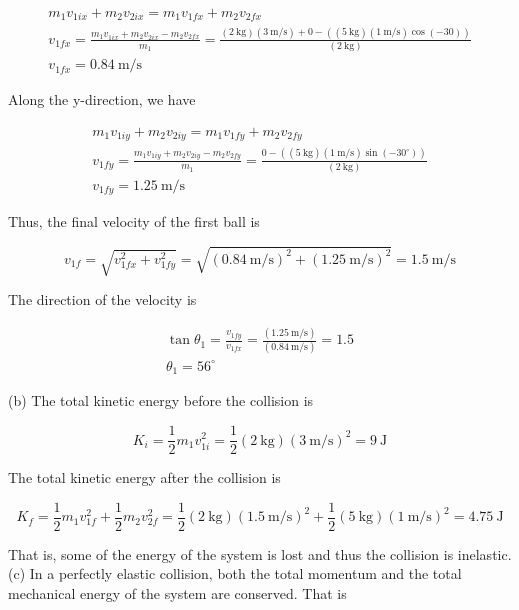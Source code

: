 \documentclass[10pt]{article}
\numberwithin{equation}{section}
\begin{document}
$$
\begin{gathered}
m_{1} v_{1 i x}+m_{2} v_{2 i x}=m_{1} v_{1 f x}+m_{2} v_{2 f x} \\
v_{1 f x}=\frac{m_{1} v_{1 i x}+m_{2} v_{2 i x}-m_{2} v_{2 f x}}{m_{1}}=\frac{(2 \mathrm{~kg})(3 \mathrm{~m} / \mathrm{s})+0-((5 \mathrm{~kg})(1 \mathrm{~m} / \mathrm{s}) \cos (-30))}{(2 \mathrm{~kg})} \\
v_{1 f x}=0.84 \mathrm{~m} / \mathrm{s}
\end{gathered}
$$

Along the y-direction, we have

$$
\begin{gathered}
m_{1} v_{1 i y}+m_{2} v_{2 i y}=m_{1} v_{1 f y}+m_{2} v_{2 f y} \\
v_{1 f y}=\frac{m_{1} v_{1 i y}+m_{2} v_{2 i y}-m_{2} v_{2 f y}}{m_{1}}=\frac{0-\left((5 \mathrm{~kg})(1 \mathrm{~m} / \mathrm{s}) \sin \left(-30^{\circ}\right)\right)}{(2 \mathrm{~kg})} \\
v_{1 f y}=1.25 \mathrm{~m} / \mathrm{s}
\end{gathered}
$$

Thus, the final velocity of the first ball is

$$
v_{1 f}=\sqrt{v_{1 f x}^{2}+v_{1 f y}^{2}}=\sqrt{(0.84 \mathrm{~m} / \mathrm{s})^{2}+(1.25 \mathrm{~m} / \mathrm{s})^{2}}=1.5 \mathrm{~m} / \mathrm{s}
$$

The direction of the velocity is

$$
\begin{gathered}
\tan \theta_{1}=\frac{v_{1 f y}}{v_{1 f x}}=\frac{(1.25 \mathrm{~m} / \mathrm{s})}{(0.84 \mathrm{~m} / \mathrm{s})}=1.5 \\
\theta_{1}=56^{\circ}
\end{gathered}
$$

(b) The total kinetic energy before the collision is

$$
K_{i}=\frac{1}{2} m_{1} v_{1 i}^{2}=\frac{1}{2}(2 \mathrm{~kg})(3 \mathrm{~m} / \mathrm{s})^{2}=9 \mathrm{~J}
$$

The total kinetic energy after the collision is

$$
K_{f}=\frac{1}{2} m_{1} v_{1 f}^{2}+\frac{1}{2} m_{2} v_{2 f}^{2}=\frac{1}{2}(2 \mathrm{~kg})(1.5 \mathrm{~m} / \mathrm{s})^{2}+\frac{1}{2}(5 \mathrm{~kg})(1 \mathrm{~m} / \mathrm{s})^{2}=4.75 \mathrm{~J}
$$

That is, some of the energy of the system is lost and thus the collision is inelastic.\\
(c) In a perfectly elastic collision, both the total momentum and the total mechanical energy of the system are conserved. That is
\end{document}
